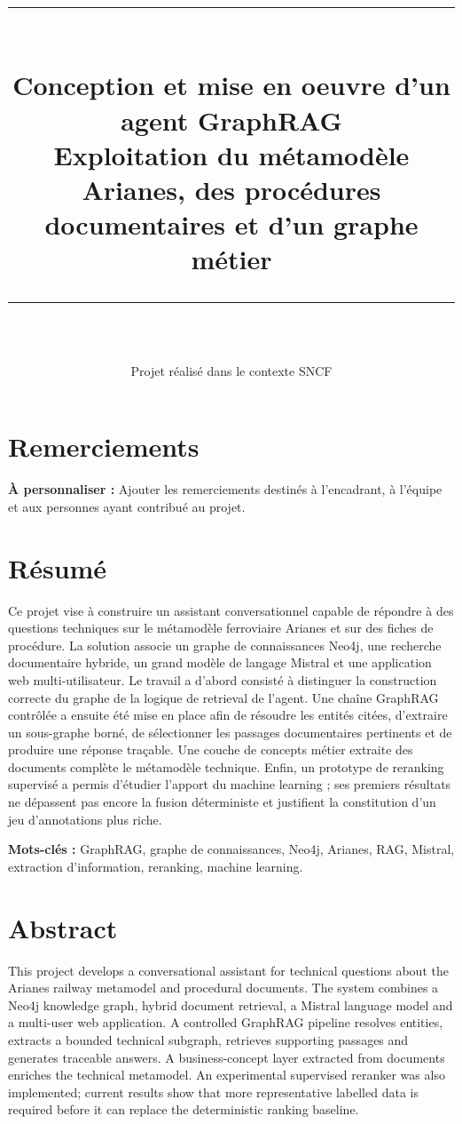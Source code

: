 \documentclass[12pt,a4paper,oneside]{report}
\title{%
  \vspace{-2cm}
  {\color{sncfviolet}\rule{\textwidth}{1.5pt}}\\[1.2cm]
  \Huge\textbf{Conception et mise en oeuvre d'un agent GraphRAG}\\[0.4cm]
  \LARGE Exploitation du métamodèle Arianes, des procédures documentaires et d'un graphe métier\\[1.2cm]
  {\color{sncfrouge}\rule{\textwidth}{1.5pt}}
}
\author{%
  \todo{Nom et prénom}\\
  \todo{Équipe, direction ou établissement}\\
  Projet réalisé dans le contexte SNCF
}
\date{\todo{Période du projet}}
\newcommand{\todo}[1]{\textcolor{sncfrouge}{\textbf{À personnaliser :} #1}}
\begin{document}
\maketitle
\thispagestyle{empty}
\clearpage

\chapter*{Remerciements}
\todo{Ajouter les remerciements destinés à l'encadrant, à l'équipe et aux personnes ayant contribué au projet.}

\chapter*{Résumé}
Ce projet vise à construire un assistant conversationnel capable de répondre à des questions techniques sur le métamodèle ferroviaire Arianes et sur des fiches de procédure. La solution associe un graphe de connaissances Neo4j, une recherche documentaire hybride, un grand modèle de langage Mistral et une application web multi-utilisateur. Le travail a d'abord consisté à distinguer la construction correcte du graphe de la logique de retrieval de l'agent. Une chaîne GraphRAG contrôlée a ensuite été mise en place afin de résoudre les entités citées, d'extraire un sous-graphe borné, de sélectionner les passages documentaires pertinents et de produire une réponse traçable. Une couche de concepts métier extraite des documents complète le métamodèle technique. Enfin, un prototype de reranking supervisé a permis d'étudier l'apport du machine learning ; ses premiers résultats ne dépassent pas encore la fusion déterministe et justifient la constitution d'un jeu d'annotations plus riche.

\medskip
\noindent\textbf{Mots-clés :} GraphRAG, graphe de connaissances, Neo4j, Arianes, RAG, Mistral, extraction d'information, reranking, machine learning.

\chapter*{Abstract}
This project develops a conversational assistant for technical questions about the Arianes railway metamodel and procedural documents. The system combines a Neo4j knowledge graph, hybrid document retrieval, a Mistral language model and a multi-user web application. A controlled GraphRAG pipeline resolves entities, extracts a bounded technical subgraph, retrieves supporting passages and generates traceable answers. A business-concept layer extracted from documents enriches the technical metamodel. An experimental supervised reranker was also implemented; current results show that more representative labelled data is required before it can replace the deterministic ranking baseline.
\end{document}
